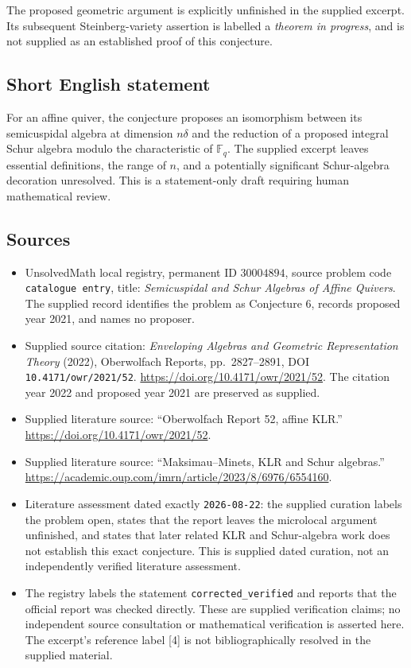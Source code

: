 \documentclass[11pt]{article}
\begin{document}
The proposed geometric argument is explicitly unfinished in the supplied excerpt. Its subsequent Steinberg-variety assertion is labelled a \emph{theorem in progress}, and is not supplied as an established proof of this conjecture.
\subsection{Short English statement}
For an affine quiver, the conjecture proposes an isomorphism between its semicuspidal algebra at dimension \(n\delta\) and the reduction of a proposed integral Schur algebra modulo the characteristic of \(\mathbb F_q\). The supplied excerpt leaves essential definitions, the range of \(n\), and a potentially significant Schur-algebra decoration unresolved. This is a statement-only draft requiring human mathematical review.
\subsection{Sources}
\begin{itemize}
\item UnsolvedMath local registry, permanent ID \(30004894\), source problem code \texttt{catalogue entry}, title: \emph{Semicuspidal and Schur Algebras of Affine Quivers}. The supplied record identifies the problem as Conjecture 6, records proposed year 2021, and names no proposer.
\item Supplied source citation: \emph{Enveloping Algebras and Geometric Representation Theory} (2022), Oberwolfach Reports, pp.\ 2827--2891, DOI \texttt{10.4171/owr/2021/52}. \url{https://doi.org/10.4171/owr/2021/52}. The citation year 2022 and proposed year 2021 are preserved as supplied.
\item Supplied literature source: ``Oberwolfach Report 52, affine KLR.'' \url{https://doi.org/10.4171/owr/2021/52}.
\item Supplied literature source: ``Maksimau--Minets, KLR and Schur algebras.'' \url{https://academic.oup.com/imrn/article/2023/8/6976/6554160}.
\item Literature assessment dated exactly \texttt{2026-08-22}: the supplied curation labels the problem open, states that the report leaves the microlocal argument unfinished, and states that later related KLR and Schur-algebra work does not establish this exact conjecture. This is supplied dated curation, not an independently verified literature assessment.
\item The registry labels the statement \texttt{corrected\_verified} and reports that the official report was checked directly. These are supplied verification claims; no independent source consultation or mathematical verification is asserted here. The excerpt's reference label [4] is not bibliographically resolved in the supplied material.
\end{itemize}
\end{document}
